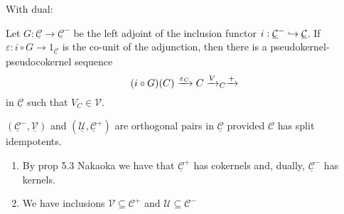 With dual:

\begin{lemma}
  Let $G:\underline{\mathcal{C}}\to\underline{\mathcal{C}}^-$ be the left adjoint
  of the inclusion functor $i:\underline{\mathcal{C}}^-\hookrightarrow \underline{\mathcal{C}}$.
  If $\varepsilon:i\circ G \to 1_{\underline{\mathcal{C}}}$ is the co-unit of the adjunction, then there is a pseudokernel-pseudocokernel
  sequence
  \begin{equation*}
    (i\circ G)(C) \xrightarrow{\varepsilon_{C}} C\xrightarrow{V}_C \xrightarrow{+}
  \end{equation*}
  in $\underline{\mathcal{C}}$ such that $V_C\in \mathcal{V}$.
\end{lemma}

\begin{corollary}
  $(\underline{\mathcal{C}}^-,\underline{\mathcal{V}})$ and $(\underline{\mathcal{U}},\underline{\mathcal{C}}^+)$ are orthogonal
  pairs in $\underline{\mathcal{C}}$ provided $\mathcal{C}$ has split idempotents.
\end{corollary}

\begin{rmk}
  \begin{enumerate}
    \item By prop 5.3 Nakaoka  we have that $\underline{\mathcal{C}}^+$ has cokernels and,
    dually, $\underline{\mathcal{C}}^-$ has kernels.
    \item We have inclusions $\mathcal{V}\subseteq \mathcal{C}^+$ and $\mathcal{U}\subseteq\mathcal{C}^-$ 
  \end{enumerate}
\end{rmk}
